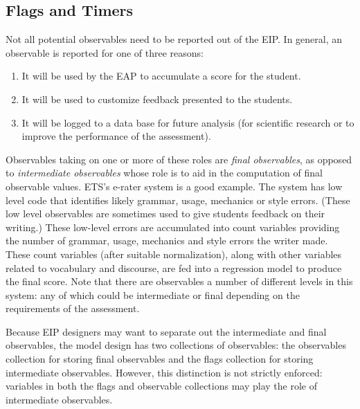 \documentclass{article}
\begin{document}
  \subsection{Flags and Timers}
  \label{sub:flags}

  Not all potential observables need to be reported out of the EIP.
  In general, an observable is reported for one of three reasons:
  \begin{enumerate}
  \item It will be used by the EAP to accumulate a score for the
    student.
  \item It will be used to customize feedback presented to the
    students.
  \item It will be logged to a data base for future analysis
      (for scientific research or to improve the performance
    of the assessment). 
  \end{enumerate}

  Observables taking on one or more of these roles are \textit{final
    observables}, as opposed to \textit{intermediate observables}
  whose role is to aid in the computation of final observable values.
  ETS's e-rater{\textregistered} system \cite{eRater} is a good example.
  The system has low level code that identifies likely grammar, usage,
  mechanics or style errors.  (These low level observables are
  sometimes used to give students feedback on their writing.)  These
  low-level errors are accumulated into count variables providing the
  number of grammar, usage, mechanics and style errors the writer
  made.  These count variables (after suitable normalization), along
  with other variables related to vocabulary and discourse, are fed
  into a regression model to produce the final score.  Note that there
  are observables a number of different levels in this system:  any of
  which could be intermediate or final depending on the requirements
  of the assessment.
  
  Because EIP designers may want to separate out the intermediate and
  final observables, the model design has two collections of
  observables:  the observables collection for storing final
  observables and the flags collection for storing intermediate
  observables.  However, this distinction is not strictly enforced:
  variables in both the flags and observable collections may play the
  role of intermediate observables.
\end{document}
